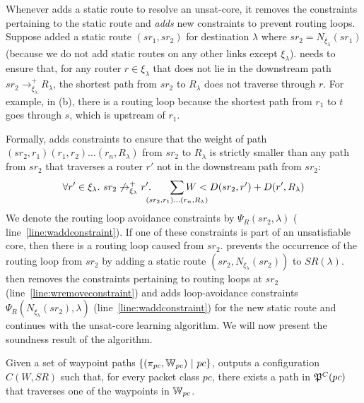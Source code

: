 Whenever \name adds a static route to resolve an unsat-core,
it removes the constraints pertaining to 
the static route and \emph{adds} new constraints to prevent
routing loops. 
Suppose \name added a static route $(sr_1, sr_2)$ for destination
$\lambda$ where $sr_2 = N_{\xi_\lambda}(sr_1)$ (because we do not add
static routes on any other links except $\xi_\lambda$). \name needs to
ensure that, for any router $r\in\xi_\lambda$ that does not 
lie in the downstream path $sr_2 \rightarrow^+_{\xi_\lambda} R_\lambda$, 
the shortest path from $sr_2$ to $R_\lambda$ does not traverse through 
$r$. For example, 
in (b), there is a routing loop because
 the shortest path from $r_1$ to $t$ goes through $s$, which is upstream of $r_1$. 

Formally, \name adds constraints to 
ensure that the weight
of path $(sr_2, r_1)(r_1, r_2)\ldots(r_n,R_\lambda)$
from $sr_2$ to $R_\lambda$ is 
strictly smaller than any path from $sr_2$ that traverses a
router $r'$ not in the downstream path from $sr_2$: 
\begin{equation} \label{eq:rla}
\forall r' \in \xi_\lambda. ~sr_2 \not\rightarrow_{\xi_\lambda}^+ r'. 
\hspace{0.6cm}\sum_{\mathclap{\substack{(sr_2, r_1)\ldots(r_n,R_\lambda)}}} 
W < D(sr_2, r') + D(r', R_\lambda) 
\end{equation}
We denote the routing loop avoidance 
constraints by $\Psi_R(sr_2, \lambda)$ 
( line~\ref{line:waddconstraint}). 
If one of these constraints is part of an unsatisfiable
core, then there is a routing 
loop caused from $sr_2$. 
\name 
prevents
the occurrence of the routing loop from $sr_2$
by adding a static route 
$(sr_2, N_{\xi_\lambda}(sr_2))$ to $SR(\lambda)$. 
\name then removes the constraints pertaining to routing
loops at $sr_2$ (line~\ref{line:wremoveconstraint}) and 
adds loop-avoidance constraints $\Psi_R(N_{\xi_\lambda}(sr_2), 
\lambda)$ (line~\ref{line:waddconstraint}) for the new static
route and continues with the unsat-core learning algorithm. We will
now present the soundness result of the algorithm.

\begin{theorem} \label{thm:wayptsr}
	Given a set of waypoint paths $\{(\pi_{pc}, \mathbb{W}_{pc}) ~|~ pc\}$,
	 outputs a configuration $C(W,SR)$ 
	such that, for every packet class $pc$, 
	there exists a path in $\mathfrak{P}^C(pc)$ that
	traverses one of the waypoints in $\mathbb{W}_{pc}$.
\end{theorem}
\iffull

\fi

